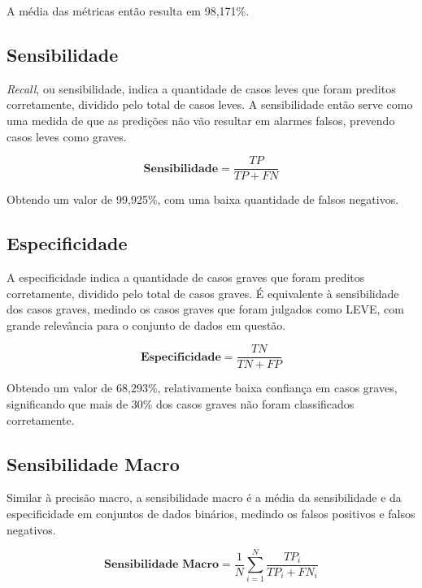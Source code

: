 A média das métricas então resulta em 98,171\%.


\subsection{Sensibilidade}
\label{subsec:sensibilidade}

\textit{Recall}, ou sensibilidade, indica a quantidade de casos leves que foram preditos corretamente, dividido pelo total de casos leves. A sensibilidade então serve como uma medida de que as predições não vão resultar em alarmes falsos, prevendo casos leves como graves.

  \begin{equation}
    \textbf{Sensibilidade} = \frac{TP}{TP + FN}
  \end{equation}

Obtendo um valor de 99,925\%, com uma baixa quantidade de falsos negativos.

\subsection{Especificidade}
\label{subsec:especificidade}

A especificidade indica a quantidade de casos graves que foram preditos corretamente, dividido pelo total de casos graves. É equivalente à sensibilidade dos casos graves, medindo os casos graves que foram julgados como LEVE, com grande relevância para o conjunto de dados em questão.

  \begin{equation}
    \textbf{Especificidade} = \frac{TN}{TN + FP}
  \end{equation}

Obtendo um valor de 68,293\%, relativamente baixa confiança em casos graves, significando que mais de 30\% dos casos graves não foram classificados corretamente.

\subsection{Sensibilidade Macro}
\label{subsec:sensibilidade-macro}

Similar à precisão macro, a sensibilidade macro é a média da sensibilidade e da especificidade em conjuntos de dados binários, medindo os falsos positivos e falsos negativos.

  \begin{equation}
    \textbf{Sensibilidade Macro} = \frac{1}{N}\sum_{i=1}^{N}\frac{TP_{i}}{TP_{i} + FN_{i}}
  \end{equation}

